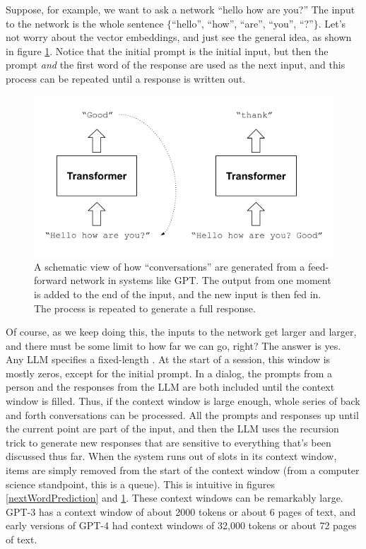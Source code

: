 Suppose, for example, we want to ask a network ``hello how are you?'' The input to the network is the whole sentence $\{$``hello'', ``how'', ``are'', ``you'', ``?''$\}$. Let's  not worry about the vector embeddings, and just see the general idea, as shown in figure \ref{gptRecursedInputs}. Notice that the initial prompt is the initial input, but then the prompt \emph{and} the first word of the response are used as the next input, and this process can be repeated until a response is written out.
  
\begin{figure}[h]
\centering
\includegraphics[scale=.7]{./images/gptRecursedInputs.png}
\caption[Jeff Yoshimi]{A schematic view of how ``conversations'' are generated from a feed-forward network in systems like GPT. The output from one moment is added to the end of the input, and the new input is then fed in. The process is repeated to generate a full response.}
\label{gptRecursedInputs}
\end{figure}

Of course, as we keep doing this, the inputs to the network get larger and larger, and there must be some limit to how far we can go, right? The answer is yes. Any LLM specifies a fixed-length . At the start of a session, this window is mostly zeros, except for the initial prompt. In a dialog, the prompts from a person and the responses from the LLM are both included until the context window is filled. Thus, if the context window is large enough, whole series of back and forth conversations can be processed. All the prompts and responses up until the current point are part of the input, and then the LLM uses the recursion trick to generate new responses that are sensitive to everything that's been discussed thus far. When the system runs out of slots in its context window, items are simply removed from the start of the context window (from a computer science standpoint, this is a queue). This is intuitive in figures \ref{nextWordPrediction} and \ref{gptRecursedInputs}. These context windows can be remarkably large. GPT-3 has a context window of about 2000 tokens or about 6 pages of text, and early versions of GPT-4 had context windows of 32,000 tokens or about 72 pages of text. 


